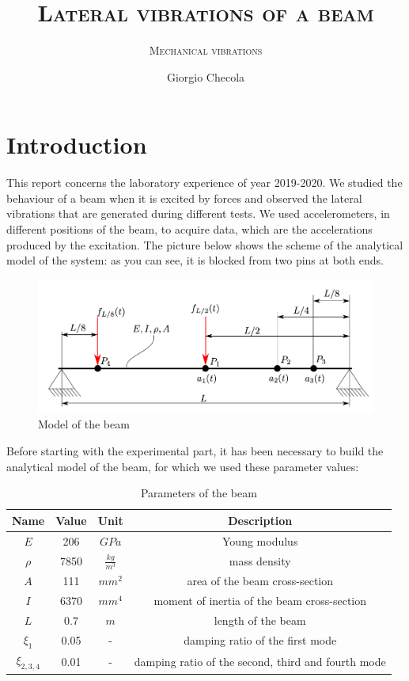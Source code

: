 \documentclass[11pt,a4paper]{article}
\title{\textsc{Lateral vibrations of a beam}}
\subtitle{\textsc{Mechanical vibrations}}
\author{Giorgio Checola}
\begin{document}
\graphicspath{ {./images/} }
\maketitle
\thispagestyle{empty}
\newpage
\thispagestyle{empty}
\mbox{}
\newpage


\section*{Introduction}	
This report concerns the laboratory experience of year 2019-2020. We studied the behaviour of a beam when it is excited by forces and observed the lateral vibrations that are generated during different tests. We used accelerometers, in different positions of the beam, to acquire data, which are the accelerations produced by the excitation.
The picture below shows the scheme of the analytical model of the system: as you can see, it is blocked from two pins at both ends.

\begin{figure}[H]
	\centering
	\includegraphics[width=150mm]{images/model.png}
	\caption{Model of the beam}
	\label{scheme}
\end{figure}

Before starting with the experimental part, it has been necessary to build the analytical model of the beam, for which we used these parameter values: 

\medskip

\begin{table}[h]
	\centering
	\begin{tabular}{c c c c} 
		\toprule
		\textbf{Name} & \textbf{Value} & \textbf{Unit} & \textbf{Description} \\ 
		\midrule	    		   	    		
		$E$     & 206  & $GPa$            & Young modulus \\	    		
		$\rho$  & 7850 & $\frac{kg}{m^3}$ & mass density \\	    		   
		$A$     & 111  & $mm^2$                 & area of the beam cross-section \\
		$I$     & 6370 & $mm^4$           & moment of inertia of the beam cross-section \\
		$L$     & 0.7  & $m$              &length of the beam\\
		$\xi_{1}$ & 0.05 & - &damping ratio of the first mode\\
		$\xi_{2,3,4}$ & 0.01 & - & damping ratio of the second, third and fourth mode\\
		\bottomrule
	\end{tabular}
	\caption{Parameters of the beam}
	\label{parameter}
\end{table}
\newpage
\end{document}
